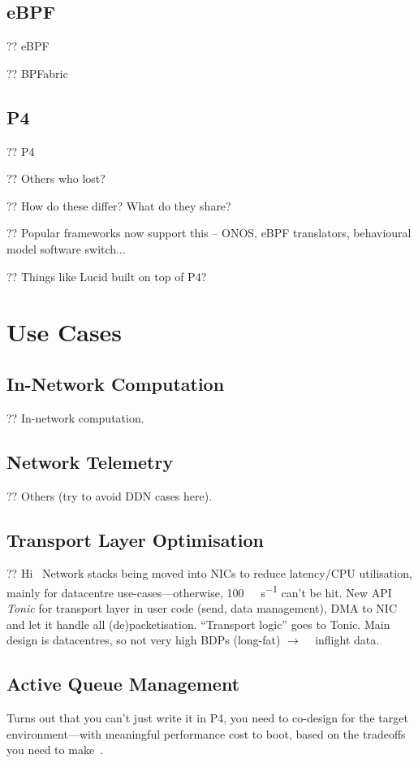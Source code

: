 \subsection{eBPF}
?? eBPF

?? BPFabric

\subsection{P4}
?? P4

?? Others who lost?

?? How do these differ? What do they share?

?? Popular frameworks now support this -- ONOS, eBPF translators, behavioural model software switch...

?? Things like Lucid built on top of P4?~\parencite{DBLP:conf/sigcomm/SonchackLRW21}

\section{Use Cases}

\subsection{In-Network Computation}
?? In-network computation.

\subsection{Network Telemetry}
?? Others (try to avoid DDN cases here).

\subsection{Transport Layer Optimisation}
?? Hi~\parencite{DBLP:conf/nsdi/ArashlooLGRWW20} Network stacks being moved into NICs to reduce latency/CPU utilisation, mainly for datacentre use-cases---otherwise, \SI{100}{\giga\bit\per\second} can't be hit. New API \emph{Tonic} for transport layer in user code (send, data management), DMA to NIC and let it handle all (de)packetisation. ``Transport logic'' goes to Tonic. Main design is datacentres, so not very high BDPs (long-fat) $\rightarrow$ \si{\kilo\byte} inflight data.

\subsection{Active Queue Management}
Turns out that you can't just write it in P4, you need to co-design for the target environment---with meaningful performance cost to boot, based on the tradeoffs you need to make~\parencite{Kunze-P4-AQM}.

